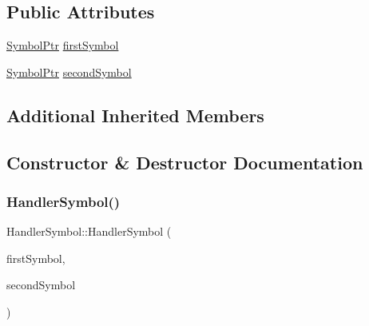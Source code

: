 \subsection*{Public Attributes}
\begin{DoxyCompactItemize}
\item 
\mbox{\hyperlink{namespace_erable_1_1_compiler_1_1_symbols_a8f0bc762f448ea4d84e8713ab3e140b9}{Symbol\+Ptr}} \mbox{\hyperlink{class_erable_1_1_compiler_1_1_symbols_1_1_handler_symbol_a9dbe5735944a60d37a358f6575c65d71}{first\+Symbol}}
\item 
\mbox{\hyperlink{namespace_erable_1_1_compiler_1_1_symbols_a8f0bc762f448ea4d84e8713ab3e140b9}{Symbol\+Ptr}} \mbox{\hyperlink{class_erable_1_1_compiler_1_1_symbols_1_1_handler_symbol_af2b4f052f351332800d5c06b70331c0a}{second\+Symbol}}
\end{DoxyCompactItemize}
\subsection*{Additional Inherited Members}


\subsection{Constructor \& Destructor Documentation}
\mbox{\label{class_erable_1_1_compiler_1_1_symbols_1_1_handler_symbol_aa9c04c81afc5b63e1d21870246ead444}} 
\subsubsection{\texorpdfstring{HandlerSymbol()}{HandlerSymbol()}}
{\footnotesize\ttfamily Handler\+Symbol\+::\+Handler\+Symbol (\begin{DoxyParamCaption}\item[{\mbox{\hyperlink{namespace_erable_1_1_compiler_1_1_symbols_a8f0bc762f448ea4d84e8713ab3e140b9}{Symbol\+Ptr}} \&\&}]{first\+Symbol,  }\item[{\mbox{\hyperlink{namespace_erable_1_1_compiler_1_1_symbols_a8f0bc762f448ea4d84e8713ab3e140b9}{Symbol\+Ptr}} \&\&}]{second\+Symbol }\end{DoxyParamCaption})}



